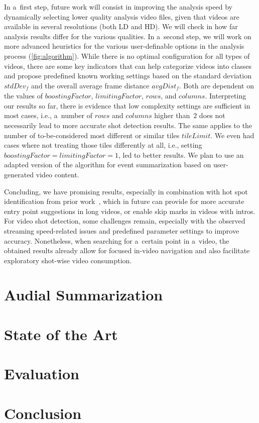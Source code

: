 In a~first step, future work will consist in improving the analysis speed by dynamically selecting lower quality analysis video files, given that videos are available in several resolutions (both LD and HD). We will check in how far analysis results differ for the various qualities. In a~second step, we will work on more advanced heuristics for the various user-definable options in the analysis process (\autoref{fig:algorithm}). While there is no optimal configuration for all types of videos, there are some key indicators that can help categorize videos into classes and propose predefined known working settings based on the standard deviation $\mathit{stdDev_{f}}$ and the overall average frame distance $\mathit{avgDist_{f}}$. Both are dependent on the values of $\mathit{boostingFactor}$, $\mathit{limitingFactor}$, $\mathit{rows}$, and $\mathit{columns}$. Interpreting our results so far, there is evidence that low complexity settings are sufficient in most cases, i.e., a~number of $\mathit{rows}$ and $\mathit{columns}$ higher than~$\mathit{2}$ does not necessarily lead to more accurate shot detection results. The same applies to the number of to-be-considered most different or similar tiles $\mathit{tileLimit}$. We even had cases where not treating those tiles differently at all, i.e., setting $\mathit{boostingFactor} = \mathit{limitingFactor} = \mathit{1}$, led to better results. We plan to use an adapted version of the algorithm for event summarization based on user-generated video content.

Concluding, we have promising results, especially in combination with hot spot identification from prior work~\cite{derive2011}, which in future can provide for more accurate entry point suggestions in long videos, or enable skip marks in videos with intros.
For video shot detection, some challenges remain, especially with the observed streaming speed-related issues and predefined parameter settings to improve accuracy. None\-theless, when searching for a~certain point in a~video, the obtained results already allow for focused in-video navigation and also facilitate exploratory shot-wise video consumption.

\section{Audial Summarization}

\section{State of the Art}

\section{Evaluation}

\section{Conclusion}